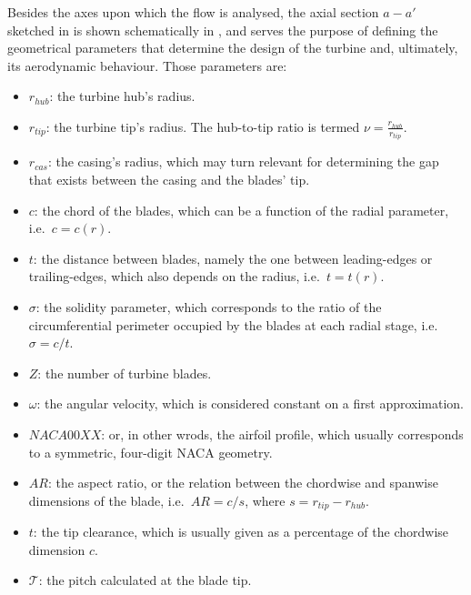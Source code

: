 Besides the axes upon which the flow is analysed, the axial section $a-a'$ sketched in  is shown schematically in , and serves the purpose of defining the geometrical parameters that determine the design of the turbine and, ultimately, its aerodynamic behaviour. Those parameters are:
\begin{itemize}
	\item{$r_{hub}$: the turbine hub's radius.}
	\item{$r_{tip}$: the turbine tip's radius. The hub-to-tip ratio is termed $\nu=\frac{r_{hub}}{r_{tip}}$.}
	\item{$r_{cas}$: the casing's radius, which may turn relevant for determining the gap that exists between the casing and the blades' tip.}
	\item{$c$: the chord of the blades, which can be a function of the radial parameter, i.e.\ $c=c\left(r\right)$.}
	\item{$t$: the distance between blades, namely the one between leading-edges or trailing-edges, which also depends on the radius, i.e.\ $t=t\left(r\right)$.}
	\item{$\sigma$: the solidity parameter, which corresponds to the ratio of the circumferential perimeter occupied by the blades at each radial stage, i.e. $\sigma=c/t$.}
	\item{$Z$: the number of turbine blades.}
	\item{$\omega$: the angular velocity, which is considered constant on a first approximation.}
	\item{$NACA00XX$: or, in other wrods, the airfoil profile, which usually corresponds to a symmetric, four-digit NACA geometry.}
	\item{$AR$: the aspect ratio, or the relation between the chordwise and spanwise dimensions of the blade, i.e.\ $AR=c/s$, where $s=r_{tip} - r_{hub}$.}
	\item{$t$: the tip clearance, which is usually given as a percentage of the chordwise dimension $c$.}
	\item{$\mathcal{T}$: the pitch calculated at the blade tip.}
\end{itemize}

